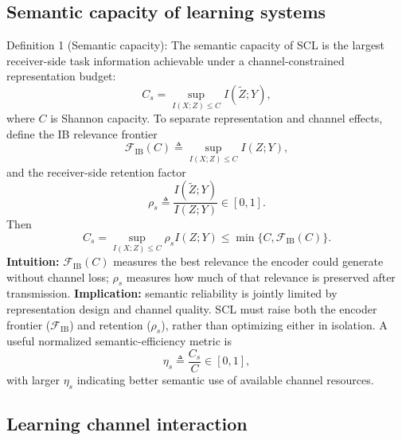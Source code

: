 \documentclass[10pt,journal]{IEEEtran}
\begin{document}
\subsection{Semantic capacity of learning systems}
Definition 1 (Semantic capacity): The semantic capacity of SCL is the largest receiver-side task information achievable under a channel-constrained representation budget:
\begin{equation}
C_s=\sup_{I(X;Z)\le C} I(\tilde{Z};Y),
\end{equation}
where $C$ is Shannon capacity.
To separate representation and channel effects, define the IB relevance frontier
\begin{equation}
\mathcal{F}_{\mathrm{IB}}(C)
\triangleq
\sup_{I(X;Z)\le C} I(Z;Y),
\end{equation}
and the receiver-side retention factor
\begin{equation}
\rho_s
\triangleq
\frac{I(\tilde{Z};Y)}{I(Z;Y)}
\in[0,1].
\end{equation}
Then
\begin{equation}
C_s=\sup_{I(X;Z)\le C} \rho_s I(Z;Y)\le\min\{C,\mathcal{F}_{\mathrm{IB}}(C)\}.
\end{equation}
\textbf{Intuition:} $\mathcal{F}_{\mathrm{IB}}(C)$ measures the best relevance the encoder could generate without channel loss; $\rho_s$ measures how much of that relevance is preserved after transmission.
\textbf{Implication:} semantic reliability is jointly limited by representation design and channel quality. SCL must raise both the encoder frontier ($\mathcal{F}_{\mathrm{IB}}$) and retention ($\rho_s$), rather than optimizing either in isolation.
A useful normalized semantic-efficiency metric is
\begin{equation}
\eta_s \triangleq \frac{C_s}{C} \in [0,1],
\end{equation}
with larger $\eta_s$ indicating better semantic use of available channel resources.


\subsection{Learning channel interaction}
\end{document}
